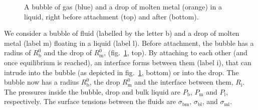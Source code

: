 \documentclass{article}
\begin{document}
\begin{figure}
\begin{center}
    \end{center}
    \caption{
        A bubble of gas (blue)  and a drop of molten metal (orange) in a 
        liquid, right before attachment (top) and after (bottom).
    }\label{fig:one}
\end{figure}

We consider a bubble of fluid (labelled by the letter b) and a drop of molten
metal (label m) floating in a liquid (label l). Before attachment, 
the bubble has a radius of $R^0_\text{b}$ and the drop of $R^0_\text{m}$, (fig.~\ref{fig:one}, top).
By attaching to each other (and once equilibrium is reached), an interface forms between them (label i), 
that can intrude into the bubble (as depicted in fig.~\ref{fig:one}, bottom) or into the drop.
The bubble now has a radius
$R^0_\text{b}$, the drop $R^0_\text{m}$ and the interface between them, $R_\text{i}$. 
The pressures inside the bubble, drop and bulk liquid are
$P_\text{b}$, $P_\text{m}$ and $P_\text{l}$, respectively. The surface tensions
between the fluids are $\sigma_\text{bm}$, $\sigma_\text{bl}$, and
$\sigma_\text{ml}$. 
\end{document}

